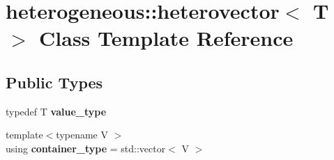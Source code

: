\hypertarget{classheterogeneous_1_1heterovector_3_01_t_01_4}{}\section{heterogeneous\+:\+:heterovector$<$ T $>$ Class Template Reference}
\label{classheterogeneous_1_1heterovector_3_01_t_01_4}
\subsection*{Public Types}
\begin{DoxyCompactItemize}
\item 
\hypertarget{classheterogeneous_1_1heterovector_3_01_t_01_4_a2ccb72a9fb4770ced0e4e8c84ec4ddbc}{}typedef T {\bfseries value\+\_\+type}\label{classheterogeneous_1_1heterovector_3_01_t_01_4_a2ccb72a9fb4770ced0e4e8c84ec4ddbc}

\item 
\hypertarget{classheterogeneous_1_1heterovector_3_01_t_01_4_a2a1c82a704ea3d0962be48a7393990e3}{}{\footnotesize template$<$typename V $>$ }\\using {\bfseries container\+\_\+type} = std\+::vector$<$ V $>$\label{classheterogeneous_1_1heterovector_3_01_t_01_4_a2a1c82a704ea3d0962be48a7393990e3}

\end{DoxyCompactItemize}
